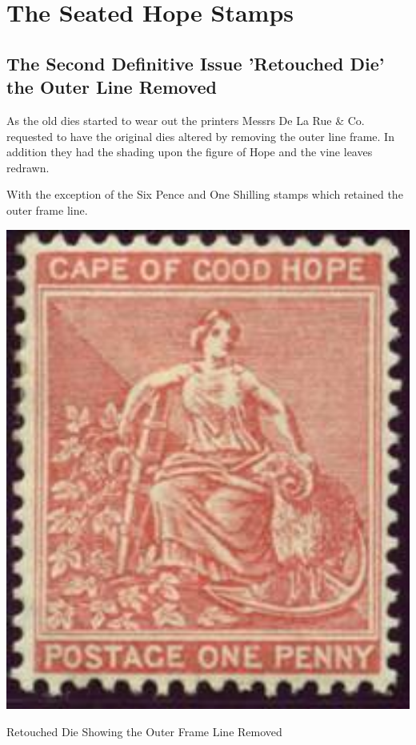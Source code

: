 \chapter{The Seated Hope Stamps}

\section{The Second Definitive Issue 'Retouched Die' the Outer Line Removed}


As the old dies started to wear out the printers Messrs De La Rue \& Co. 
requested to have the original dies altered by removing the outer line frame. 
In addition they had the shading upon the figure of Hope and the vine 
leaves redrawn.

With the exception of the Six Pence and One Shilling stamps which 
retained the outer frame line.


\begin{marginfigure}
\includegraphics[width=1.0\textwidth]{../cape-of-good-hope/clip_image002_0002.jpg}
\caption{
Retouched Die Showing the Outer Frame Line Removed
}
\end{marginfigure}

